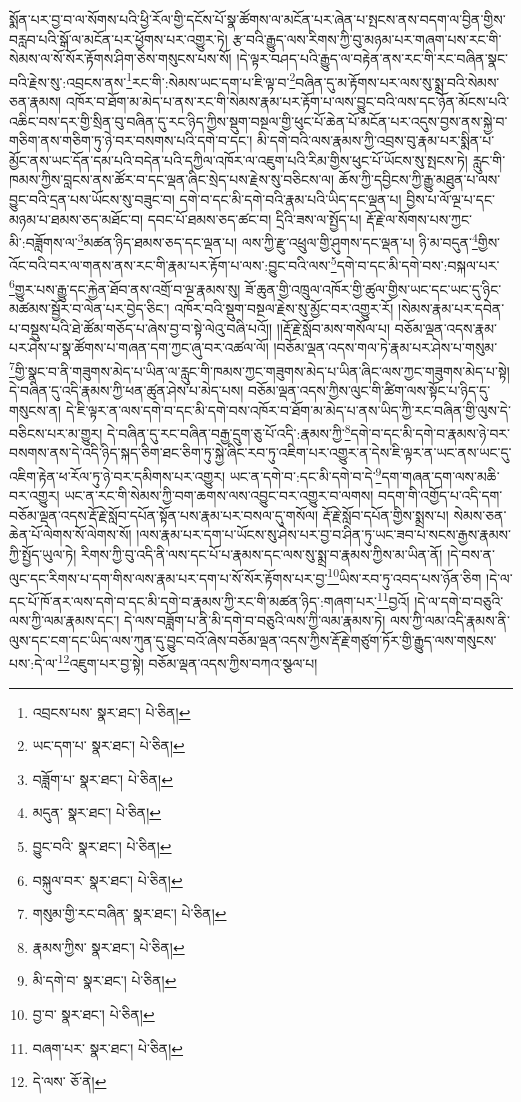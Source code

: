 སྨོན་པར་བྱ་བ་ལ་སོགས་པའི་ཕྱི་རོལ་གྱི་དངོས་པོ་སྣ་ཚོགས་ལ་མངོན་པར་ཞེན་པ་སྤངས་ནས་བདག་ལ་བྱིན་གྱིས་བརླབ་པའི་སྒོ་ལ་མངོན་པར་ཕྱོགས་པར་འགྱུར་ཏེ། རྩ་བའི་རྒྱུད་ལས་རིགས་ཀྱི་བུ་མཉམ་པར་གཞག་པས་རང་གི་སེམས་ལ་སོ་སོར་རྟོགས་ཤིག་ཅེས་གསུངས་པས་སོ། །དེ་ལྟར་བཤད་པའི་རྒྱུད་ལ་བརྟེན་ནས་རང་གི་རང་བཞིན་སྣང་བའི་རྗེས་སུ་:འབྲངས་ནས་\footnote{འབྲངས་པས་  སྣར་ཐང་།  པེ་ཅིན། }རང་གི་:སེམས་ཡང་དག་པ་ཇི་ལྟ་བ་\footnote{ཡང་དག་པ་  སྣར་ཐང་།  པེ་ཅིན། }བཞིན་དུ་མ་རྟོགས་པར་ལས་སུ་སྨྲ་བའི་སེམས་ཅན་རྣམས། འཁོར་བ་ཐོག་མ་མེད་པ་ནས་རང་གི་སེམས་རྣམ་པར་རྟོག་པ་ལས་བྱུང་བའི་ལས་དང་ཉོན་མོངས་པའི་འཆིང་བས་དར་གྱི་སྲིན་བུ་བཞིན་དུ་རང་ཉིད་ཀྱིས་སྡུག་བསྔལ་གྱི་ཕུང་པོ་ཆེན་པོ་མངོན་པར་འདུས་བྱས་ནས་སྐྱེ་བ་གཅིག་ནས་གཅིག་ཏུ་ཉེ་བར་བསགས་པའི་དགེ་བ་དང་། མི་དགེ་བའི་ལས་རྣམས་ཀྱི་འབྲས་བུ་རྣམ་པར་སྨིན་པ་མྱོང་ནས་ཡང་དོན་དམ་པའི་བདེན་པའི་དཀྱིལ་འཁོར་ལ་འཇུག་པའི་རིམ་གྱིས་ཕུང་པོ་ཡོངས་སུ་སྤངས་ཏེ། རླུང་གི་ཁམས་ཀྱིས་བླངས་ནས་ཚོར་བ་དང་ལྡན་ཞིང་སྲེད་པས་རྗེས་སུ་བཅིངས་ལ། ཆོས་ཀྱི་དབྱིངས་ཀྱི་རྒྱུ་མཐུན་པ་ལས་བྱུང་བའི་དྲན་པས་ཡོངས་སུ་བཟུང་བ། དགེ་བ་དང་མི་དགེ་བའི་རྣམ་པའི་ཡིད་དང་ལྡན་པ། བྱིས་པ་ལོ་ལྔ་པ་དང་མཉམ་པ་ཐམས་ཅད་མཐོང་བ། དབང་པོ་ཐམས་ཅད་ཚང་བ། དྲིའི་ཟས་ལ་སྤྱོད་པ། རྡོ་རྗེ་ལ་སོགས་པས་ཀྱང་མི་:བཟློགས་ལ་\footnote{བཟློག་པ་  སྣར་ཐང་།  པེ་ཅིན། }མཚན་ཉིད་ཐམས་ཅད་དང་ལྡན་པ། ལས་ཀྱི་རྫུ་འཕྲུལ་གྱི་ཤུགས་དང་ལྡན་པ། ཉི་མ་བདུན་\footnote{མདུན་  སྣར་ཐང་།  པེ་ཅིན། }གྱིས་འོང་བའི་བར་ལ་གནས་ནས་རང་གི་རྣམ་པར་རྟོག་པ་ལས་:བྱུང་བའི་ལས་\footnote{བྱུང་བའི་  སྣར་ཐང་།  པེ་ཅིན། }དགེ་བ་དང་མི་དགེ་བས་:བསྐལ་པར་\footnote{བསྐུལ་བར་  སྣར་ཐང་།  པེ་ཅིན། }གྱུར་པས་རྒྱུ་དང་རྐྱེན་ཐོབ་ནས་འགྲོ་བ་ལྔ་རྣམས་སུ། ཟོ་ཆུན་གྱི་འཁྲུལ་འཁོར་གྱི་ཚུལ་གྱིས་ཡང་དང་ཡང་དུ་ཉིང་མཚམས་སྦྱོར་བ་ལེན་པར་བྱེད་ཅིང་། འཁོར་བའི་སྡུག་བསྔལ་རྗེས་སུ་མྱོང་བར་འགྱུར་རོ། །སེམས་རྣམ་པར་དབེན་པ་བསྡུས་པའི་ཐེ་ཚོམ་གཅོད་པ་ཞེས་བྱ་བ་སྟེ་ལེའུ་བཞི་པའོ།། །།རྡོ་རྗེ་སློབ་མས་གསོལ་པ། བཅོམ་ལྡན་འདས་རྣམ་པར་ཤེས་པ་སྣ་ཚོགས་པ་གཞན་དག་ཀྱང་ཞུ་བར་འཚལ་ལོ། །བཅོམ་ལྡན་འདས་གལ་ཏེ་རྣམ་པར་ཤེས་པ་གསུམ་\footnote{གསུམ་གྱི་རང་བཞིན་  སྣར་ཐང་།  པེ་ཅིན། }གྱི་སྣང་བ་ནི་གཟུགས་མེད་པ་ཡིན་ལ་རླུང་གི་ཁམས་ཀྱང་གཟུགས་མེད་པ་ཡིན་ཞིང་ལས་ཀྱང་གཟུགས་མེད་པ་སྟེ། དེ་བཞིན་དུ་འདི་རྣམས་ཀྱི་ཕན་ཚུན་ཤེས་པ་མེད་པས། བཅོམ་ལྡན་འདས་ཀྱིས་ལུང་གི་ཚིག་ལས་སྟོང་པ་ཉིད་དུ་གསུངས་ན། དེ་ཇི་ལྟར་ན་ལས་དགེ་བ་དང་མི་དགེ་བས་འཁོར་བ་ཐོག་མ་མེད་པ་ནས་ཡིད་ཀྱི་རང་བཞིན་གྱི་ལུས་དེ་བཅིངས་པར་མ་གྱུར། དེ་བཞིན་དུ་རང་བཞིན་བརྒྱ་དྲུག་ཅུ་པོ་འདི་:རྣམས་ཀྱི་\footnote{རྣམས་ཀྱིས་  སྣར་ཐང་།  པེ་ཅིན། }དགེ་བ་དང་མི་དགེ་བ་རྣམས་ཉེ་བར་བསགས་ནས་དེ་འདི་ཉིད་སྐད་ཅིག་ཐང་ཅིག་ཏུ་སྐྱེ་ཞིང་རབ་ཏུ་འཇིག་པར་འགྱུར་ན་དེས་ཇི་ལྟར་ན་ཡང་ནས་ཡང་དུ་འཇིག་རྟེན་ཕ་རོལ་ཏུ་ཉེ་བར་དམིགས་པར་འགྱུར། ཡང་ན་དགེ་བ་:དང་མི་དགེ་བ་དེ་\footnote{མི་དགེ་བ་  སྣར་ཐང་།  པེ་ཅིན། }དག་གཞན་དག་ལས་མཆི་བར་འགྱུར། ཡང་ན་རང་གི་སེམས་ཀྱི་བག་ཆགས་ལས་འབྱུང་བར་འགྱུར་བ་ལགས། བདག་གི་འགྱོད་པ་འདི་དག་བཅོམ་ལྡན་འདས་རྡོ་རྗེ་སློབ་དཔོན་སྟོན་པས་རྣམ་པར་བསལ་དུ་གསོལ། རྡོ་རྗེ་སློབ་དཔོན་གྱིས་སྨྲས་པ། སེམས་ཅན་ཆེན་པོ་ལེགས་སོ་ལེགས་སོ། །ལས་རྣམ་པར་དག་པ་ཡོངས་སུ་ཤེས་པར་བྱ་བ་ཤིན་ཏུ་ཡང་ཟབ་པ་སངས་རྒྱས་རྣམས་ཀྱི་སྤྱོད་ཡུལ་ཏེ། རིགས་ཀྱི་བུ་འདི་ནི་ལས་དང་པོ་པ་རྣམས་དང་ལས་སུ་སྨྲ་བ་རྣམས་ཀྱིས་མ་ཡིན་ནོ། །དེ་བས་ན་ལུང་དང་རིགས་པ་དག་གིས་ལས་རྣམ་པར་དག་པ་སོ་སོར་རྟོགས་པར་བྱ་\footnote{བྱ་བ་  སྣར་ཐང་།  པེ་ཅིན། }ཡིས་རབ་ཏུ་འབད་པས་ཉོན་ཅིག །དེ་ལ་དང་པོ་ཁོ་ནར་ལས་དགེ་བ་དང་མི་དགེ་བ་རྣམས་ཀྱི་རང་གི་མཚན་ཉིད་:གཞག་པར་\footnote{བཞག་པར་  སྣར་ཐང་།  པེ་ཅིན། }བྱའོ། །དེ་ལ་དགེ་བ་བཅུའི་ལས་ཀྱི་ལམ་རྣམས་དང་། དེ་ལས་བཟློག་པ་ནི་མི་དགེ་བ་བཅུའི་ལས་ཀྱི་ལམ་རྣམས་ཏེ། ལས་ཀྱི་ལམ་འདི་རྣམས་ནི་ལུས་དང་ངག་དང་ཡིད་ལས་ཀུན་དུ་བྱུང་བའོ་ཞེས་བཅོམ་ལྡན་འདས་ཀྱིས་རྡོ་རྗེ་གཙུག་ཏོར་གྱི་རྒྱུད་ལས་གསུངས་པས་:དེ་ལ་\footnote{དེ་ལས་  ཅོ་ནེ། }འཇུག་པར་བྱ་སྟེ། བཅོམ་ལྡན་འདས་ཀྱིས་བཀའ་སྩལ་པ། 